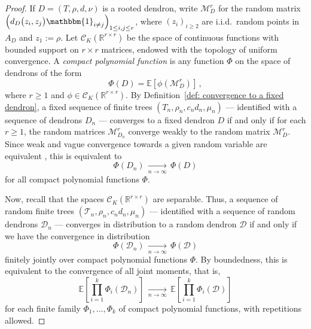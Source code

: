 \documentclass{article}
\theoremstyle{remark}
\newcommand{\bR}{\mathbb{R}}
\newcommand{\cv}[1]{\,\underset{#1}{\longrightarrow}\,}
\newcommand{\cT}{\mathcal{T}}
\newcommand{\cD}{\mathcal{D}}
\newcommand{\cM}{\mathcal{M}}
\newcommand{\cC}{\mathcal{C}}
\newcommand{\expec}[1]{\mathbb{E}{\left[#1\right]}}
\newcommand{\One}[1]{\mathbbm{1}_{#1}}
\begin{document}
\begin{proof}
    If $D=(T,\rho,d,\nu)$ is a rooted dendron, write $\cM_D^r$ for the random matrix $\left( d_D{\big( z_i, z_j \big)} \One{i\ne j} \right)_{1\le i,j\le r}$, where $(z_i)_{i\ge2}$ are i.i.d.~random points in $A_D$ and $z_1 := \rho$. 
    Let $\cC_K(\bR^{r\times r})$ be the space of continuous functions with bounded support on $r\times r$ matrices, endowed with the topology of uniform convergence.
    A \emph{compact polynomial function} is any function $\Phi$ on the space of dendrons of the form
    \begin{equation*}
        \Phi(D) = \expec{ \phi{\left( \cM_D^r \right)} }\,,
    \end{equation*}
    where $r\ge1$ and $\phi \in \cC_K(\bR^{r\times r})$.
    By Definition~\ref{def: convergence to a fixed dendron}, a fixed sequence of finite trees $(T_n, \rho_n, c_n d_n, \mu_n)$ --- identified with a sequence of dendrons $D_n$ --- converges to a fixed dendron $D$ if and only if for each $r\ge1$, the random matrices $\cM_{D_n}^r$ converge weakly to the random matrix $\cM_D^r$.
    Since weak and vague convergence towards a given random variable are equivalent \cite[Lemma~6.21]{Kallenberg_2006}, this is equivalent to
    \[
        \Phi(D_n) \cv{n\to\infty} \Phi(D)
    \]
    for all compact polynomial functions $\Phi$.
    
    Now, recall that the spaces $\cC_K(\bR^{r\times r})$ are separable.
    Thus, a sequence of random finite trees $(\cT_n, \rho_n, c_n d_n, \mu_n)$ --- identified with a sequence of random dendrons $\cD_n$ --- converges in distribution to a random dendron $\cD$ if and only if we have the convergence in distribution
    \[
        \Phi(\cD_n) \cv{n\to\infty} \Phi(\cD)
    \]
    finitely jointly over compact polynomial functions $\Phi$.
    By boundedness, this is equivalent to the convergence of all joint moments, that is,
    \[
        \expec{ \prod_{i=1}^k \Phi_i(\cD_n) }
        \cv{n\to\infty}
        \expec{ \prod_{i=1}^k \Phi_i(\cD) }
    \]
    for each finite family $\Phi_1, \dots, \Phi_k$ of compact polynomial functions, with repetitions allowed.


\end{proof}
\end{document}
